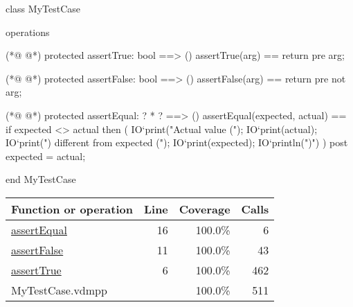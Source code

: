 \begin{vdmpp}[breaklines=true]
class MyTestCase

operations


(*@
\label{assertTrue:6}
@*)
 protected assertTrue: bool ==> ()
 assertTrue(arg) == 
  return 
 pre arg;
  
(*@
\label{assertFalse:11}
@*)
 protected assertFalse: bool ==> ()
 assertFalse(arg) == 
  return 
 pre not arg;
 
(*@
\label{assertEqual:16}
@*)
 protected assertEqual: ? * ? ==> ()
 assertEqual(expected, actual) == 
  if expected <> actual then (
     IO`print("Actual value (");
     IO`print(actual); 
     IO`print(") different from expected (");
     IO`print(expected);
     IO`println(")\n")
  )
 post expected = actual;

end MyTestCase
\end{vdmpp}
\bigskip
\begin{longtable}{|l|r|r|r|}
\hline
Function or operation & Line & Coverage & Calls \\
\hline
\hline
\hyperref[assertEqual:16]{assertEqual} & 16&100.0\% & 6 \\
\hline
\hyperref[assertFalse:11]{assertFalse} & 11&100.0\% & 43 \\
\hline
\hyperref[assertTrue:6]{assertTrue} & 6&100.0\% & 462 \\
\hline
\hline
MyTestCase.vdmpp & & 100.0\% & 511 \\
\hline
\end{longtable}

